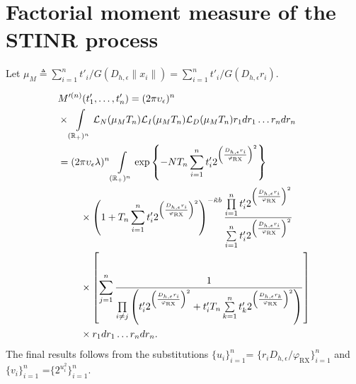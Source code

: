 \documentclass[lettersize,journal]{IEEEtran}
\newcommand{\R}{\mathbb{R}}
\begin{document}


\appendices

\section{Factorial moment measure of the STINR process}
Let $\mu_M \triangleq \sum_{i=1}^nt'_i/G(D_{h,\epsilon}\|x_i\|)=\sum_{i=1}^nt'_i/G(D_{h,\epsilon} r_i)$.

\begin{align}
  &M'^{(n)}(t'_1,\dots,t'_n) =(2 \pi \upsilon_{\epsilon})^n\nonumber\\
  & \times\int\limits_{(\R_+)^n} \mathcal{L}_N(\mu_MT_n)\mathcal{L}_I(\mu_MT_n)\mathcal{L}_D(\mu_MT_n) r_1 dr_1 \dots r_n dr_n\nonumber \\
  &=(2 \pi \upsilon_{\epsilon} \lambda)^n \int\limits_{(\R_+)^n} \exp\left\{-NT_n\sum\limits_{i=1}^nt'_i2^{\left(\frac{D_{h,\epsilon}r_i}{\varphi_{\text{RX}}}\right)^2}\right\} \nonumber\\
  &\hspace{0.8cm}\times\left(1+T_n\sum\limits_{i=1}^nt'_i2^{\left(\frac{D_{h,\epsilon}r_i}{\varphi_{\text{RX}}}\right)^2}\right)^{- \tilde{\kappa}b} \frac{\prod\limits_{i=1}^nt'_i2^{\left(\frac{D_{h,\epsilon}r_i}{\varphi_{\text{RX}}}\right)^2}}{\sum\limits_{i=1}^nt'_i2^{\left(\frac{D_{h,\epsilon}r_i}{\varphi_{\text{RX}}}\right)^2}} \nonumber\\
  &\hspace{0.8cm}\times  \left[\sum\limits_{j=1}^n\frac{1}{\prod\limits_{i\neq j}\left(t'_i 2^{\left(\frac{D_{h,\epsilon}r_i}{\varphi_{\text{RX}}}\right)^2}+ t_i'T_n\sum\limits_{k=1}^nt'_k2^{\left(\frac{D_{h,\epsilon}r_k}{\varphi_{\text{RX}}}\right)^2} \right)} \right] \nonumber\\
  &\hspace{0.8cm}\times r_1 dr_1 \dots r_n dr_n.
\end{align}
The final results follows from the substitutions $\{u_i\}_{i= 1}^n$= $\{r_i D_{h,\epsilon}/\varphi_{\text{RX}}\}_{i= 1}^n$ and $\{v_i\}_{i= 1}^n$ =$\{ 2^{u^2_i}\}_{i= 1}^n$.
\end{document}
